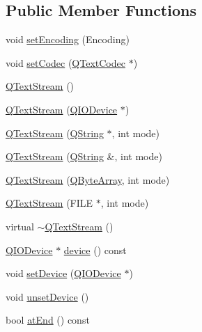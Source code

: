 \subsection*{Public Member Functions}
\begin{DoxyCompactItemize}
\item 
void \mbox{\hyperlink{class_q_text_stream_ad06dc1f99476aed01fa8a822e871dc44}{set\+Encoding}} (Encoding)
\item 
void \mbox{\hyperlink{class_q_text_stream_a18bdd4ae41cd9b37ec06827658fbf447}{set\+Codec}} (\mbox{\hyperlink{class_q_text_codec}{Q\+Text\+Codec}} $\ast$)
\item 
\mbox{\hyperlink{class_q_text_stream_aa7bbd71ba288daceba843f54f0c306a4}{Q\+Text\+Stream}} ()
\item 
\mbox{\hyperlink{class_q_text_stream_a431c964c498560a2459d55808ccaff89}{Q\+Text\+Stream}} (\mbox{\hyperlink{class_q_i_o_device}{Q\+I\+O\+Device}} $\ast$)
\item 
\mbox{\hyperlink{class_q_text_stream_a7abe6ca8fe34120632550a88c6f67cc5}{Q\+Text\+Stream}} (\mbox{\hyperlink{class_q_string}{Q\+String}} $\ast$, int mode)
\item 
\mbox{\hyperlink{class_q_text_stream_a917a19a834861178ce1a7c57ee37ec41}{Q\+Text\+Stream}} (\mbox{\hyperlink{class_q_string}{Q\+String}} \&, int mode)
\item 
\mbox{\hyperlink{class_q_text_stream_a00d490a0530b4bcd9554b9316815d35a}{Q\+Text\+Stream}} (\mbox{\hyperlink{class_q_array}{Q\+Byte\+Array}}, int mode)
\item 
\mbox{\hyperlink{class_q_text_stream_a53439eda88c78b200b675b7909343b10}{Q\+Text\+Stream}} (F\+I\+LE $\ast$, int mode)
\item 
virtual \mbox{\hyperlink{class_q_text_stream_a5c3a2ab73dceff949ec36db41df64944}{$\sim$\+Q\+Text\+Stream}} ()
\item 
\mbox{\hyperlink{class_q_i_o_device}{Q\+I\+O\+Device}} $\ast$ \mbox{\hyperlink{class_q_text_stream_a50f5712b3231e41af256c5faadf69512}{device}} () const
\item 
void \mbox{\hyperlink{class_q_text_stream_a20bb0f4064d19330d4ed6bb56299fba7}{set\+Device}} (\mbox{\hyperlink{class_q_i_o_device}{Q\+I\+O\+Device}} $\ast$)
\item 
void \mbox{\hyperlink{class_q_text_stream_a6d8aeebd7f4b1cc9f2dce27f6a0d9bd9}{unset\+Device}} ()
\item 
bool \mbox{\hyperlink{class_q_text_stream_a07ba00c9cec9d02ccb9bef9832932c9e}{at\+End}} () const
\item 

\end{DoxyCompactItemize}
